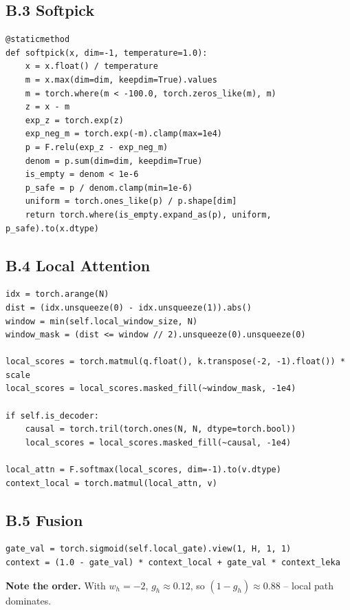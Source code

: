 \subsection{B.3 Softpick}

\begin{lstlisting}
@staticmethod
def softpick(x, dim=-1, temperature=1.0):
    x = x.float() / temperature
    m = x.max(dim=dim, keepdim=True).values
    m = torch.where(m < -100.0, torch.zeros_like(m), m)
    z = x - m
    exp_z = torch.exp(z)
    exp_neg_m = torch.exp(-m).clamp(max=1e4)
    p = F.relu(exp_z - exp_neg_m)
    denom = p.sum(dim=dim, keepdim=True)
    is_empty = denom < 1e-6
    p_safe = p / denom.clamp(min=1e-6)
    uniform = torch.ones_like(p) / p.shape[dim]
    return torch.where(is_empty.expand_as(p), uniform, p_safe).to(x.dtype)
\end{lstlisting}

\subsection{B.4 Local Attention}

\begin{lstlisting}
idx = torch.arange(N)
dist = (idx.unsqueeze(0) - idx.unsqueeze(1)).abs()
window = min(self.local_window_size, N)
window_mask = (dist <= window // 2).unsqueeze(0).unsqueeze(0)

local_scores = torch.matmul(q.float(), k.transpose(-2, -1).float()) * scale
local_scores = local_scores.masked_fill(~window_mask, -1e4)

if self.is_decoder:
    causal = torch.tril(torch.ones(N, N, dtype=torch.bool))
    local_scores = local_scores.masked_fill(~causal, -1e4)

local_attn = F.softmax(local_scores, dim=-1).to(v.dtype)
context_local = torch.matmul(local_attn, v)
\end{lstlisting}

\subsection{B.5 Fusion}

\begin{lstlisting}
gate_val = torch.sigmoid(self.local_gate).view(1, H, 1, 1)
context = (1.0 - gate_val) * context_local + gate_val * context_leka
\end{lstlisting}

\textbf{Note the order.} With $w_h = -2$, $g_h \approx 0.12$, so $(1-g_h) \approx 0.88$ -- local path dominates.

